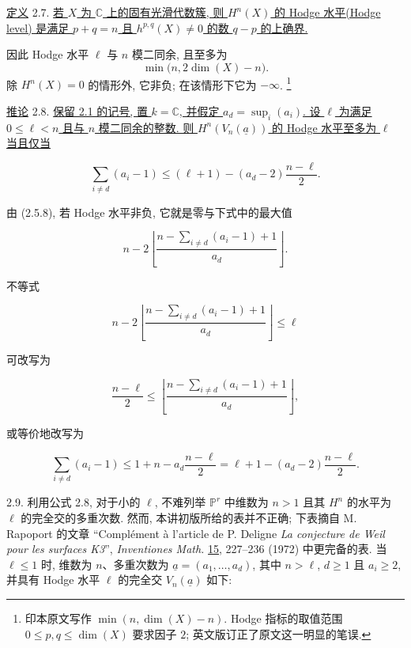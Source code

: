 \underline{定义} 2.7. \underline{若 $X$ 为 $\mathbb C$ 上的固有光滑代数簇, 则 $H^n(X)$ 的 Hodge 水平(Hodge level) 是满足 $p+q=n$ 且 $h^{p,q}(X)\ne0$ 的数 $q-p$ 的上确界.}

因此 Hodge 水平 $\ell$ 与 $n$ 模二同余, 且至多为
\[
\min\bigl(n,2\dim(X)-n\bigr).
\]
除 $H^n(X)=0$ 的情形外, 它非负; 在该情形下它为 $-\infty$.
\footnote{印本原文写作 $\min(n,\dim(X)-n)$. Hodge 指标的取值范围 $0\leq p,q\leq\dim(X)$ 要求因子 $2$; 英文版订正了原文这一明显的笔误.}

\underline{推论} 2.8. \underline{保留 2.1 的记号, 置 $k=\mathbb C$, 并假定 $a_d=\sup_i(a_i)$. 设 $\ell$ 为满足 $0\leq\ell<n$ 且与 $n$ 模二同余的整数. 则 $H^n(V_n(\underline a))$ 的 Hodge 水平至多为 $\ell$ 当且仅当}


\begin{equation*}
\sum_{i\ne d}(a_i-1)
\leq (\ell+1)-(a_d-2)\frac{n-\ell}{2}.
\end{equation*}

由 (2.5.8), 若 Hodge 水平非负, 它就是零与下式中的最大值

\begin{equation*}
n-2\left\lfloor
\frac{n-\sum_{i\ne d}(a_i-1)+1}{a_d}
\right\rfloor.
\end{equation*}

不等式

\begin{equation*}
n-2\left\lfloor
\frac{n-\sum_{i\ne d}(a_i-1)+1}{a_d}
\right\rfloor\leq\ell
\end{equation*}

可改写为

\begin{equation*}
\frac{n-\ell}{2}
\leq
\left\lfloor
\frac{n-\sum_{i\ne d}(a_i-1)+1}{a_d}
\right\rfloor,
\end{equation*}

或等价地改写为

\begin{equation*}
\sum_{i\ne d}(a_i-1)
\leq 1+n-a_d\frac{n-\ell}{2}
=\ell+1-(a_d-2)\frac{n-\ell}{2}.
\end{equation*}

2.9. 利用公式 2.8, 对于小的 $\ell$, 不难列举 $\mathbb P^r$ 中维数为 $n>1$ 且其 $H^n$ 的水平为 $\ell$ 的完全交的多重次数. 然而, 本讲初版所给的表并不正确; 下表摘自 M. Rapoport 的文章 ``Complément à l'article de P. Deligne \emph{La conjecture de Weil pour les surfaces K3}'', \emph{Inventiones Math.} \underline{15}, 227--236 (1972) 中更完备的表. 当 $\ell\leq1$ 时, 维数为 $n$、多重次数为 $\underline a=(a_1,\ldots,a_d)$, 其中 $n>\ell$, $d\geq1$ 且 $a_i\geq2$, 并具有 Hodge 水平 $\ell$ 的完全交 $V_n(\underline a)$ 如下:

